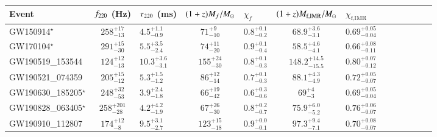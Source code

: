 \begin{tabular}{lclclclclclcl}
\toprule
Event & $f_{\text{220}}$ (Hz) & $\tau_{\text{220}}$ (ms) & $(1+z)M_f/M_{\odot}$ & $\chi_f$ & $(1+z)M_{\text{f,IMR}}/M_{\odot}$ & $\chi_{\text{f,IMR}}$\\[0.075cm]
\midrule
\hline

GW150914$^\star$ &
$258^{+17}_{-13}$ &
$4.5^{+1.1}_{-0.9}$ &
$71^{+9}_{-10}$ &
$0.8^{+0.1}_{-0.2}$ &
$68.9^{+3.6}_{-3.1}$ &
$0.69^{+0.05}_{-0.04}$
\\[0.075cm]

GW170104$^\star$ &
$291^{+15}_{-30}$ &
$5.5^{+3.5}_{-2.4}$ &
$74^{+11}_{-20}$ &
$0.9^{+0.1}_{-0.4}$&
$58.5^{+4.6}_{-4.1}$ &
$0.66^{+0.08}_{-0.11}$
\\[0.075cm]

GW190519\_153544 &
$124^{+12}_{-13}$ &
$10.3^{+3.6}_{-3.1}$ &
$155^{+24}_{-30}$ &
$0.8^{+0.1}_{-0.3}$&
$148.2^{+14.5}_{-15.5}$ &
$0.80^{+0.07}_{-0.12}$
\\[0.075cm]

GW190521\_074359 &
$205^{+15}_{-12}$ &
$5.3^{+1.5}_{-1.2}$ &
$86^{+12}_{-14}$ &
$0.7^{+0.1}_{-0.3}$&
$88.1^{+4.3}_{-4.9}$ &
$0.72^{+0.05}_{-0.07}$
\\[0.075cm]

GW190630\_185205$^\star$ &
$248^{+32}_{-53}$ &
$3.9^{+2.4}_{-1.8}$ &
$66^{+19}_{-42}$ &
$0.6^{+0.3}_{-0.6}$&
$69^{+4}_{-3}$ &
$0.69^{+0.05}_{-0.04}$
\\[0.075cm]

GW190828\_063405$^\star$ &
$258^{+201}_{-28}$ &
$4.2^{+4.2}_{-1.9}$ &
$67^{+26}_{-30}$ &
$0.8^{+0.2}_{-0.7}$&
$75.9^{+6.0}_{-5.2}$ &
$0.76^{+0.06}_{-0.07}$
\\[0.075cm]

GW190910\_112807 &
$174^{+12}_{-8}$ &
$9.5^{+3.1}_{-2.7}$ &
$123^{+15}_{-18}$ &
$0.9^{+0.0}_{-0.1}$&
$97.3^{+9.4}_{-7.1}$ &
$0.70^{+0.08}_{-0.07}$
\\[0.075cm]

\bottomrule
\end{tabular}